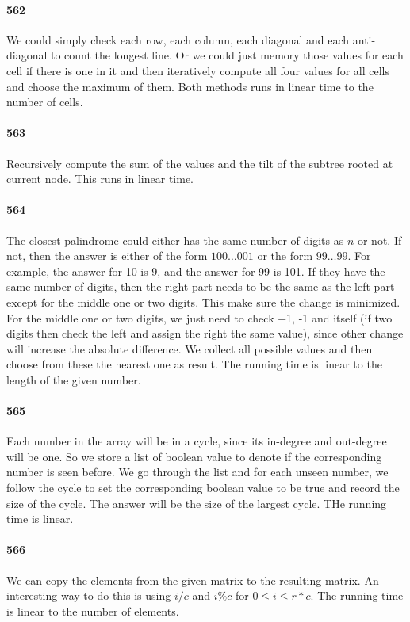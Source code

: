 \documentclass[11pt]{article}
\begin{document}
\begin{itemize}
\paragraph{562}
We could simply check each row, each column, each diagonal and each anti-diagonal to count the longest line. Or we could just
memory those values for each cell if there is one in it and then iteratively compute all four values for all cells and choose
the maximum of them. Both methods runs in linear time to the number of cells.

\paragraph{563}
Recursively compute the sum of the values and the tilt of the subtree rooted at current node. This runs in linear time.

\paragraph{564}
The closest palindrome could either has the same number of digits as $n$ or not. If not, then the answer is either of the form
$100 \dots 001$ or the form $99\dots99$. For example, the answer for 10 is 9, and the answer for 99 is 101. 
If they have the same number of digits, then the right part needs to be the same as the left part except for the middle one
or two digits. This make sure the change is minimized. For the middle one or two digits, we just need to check +1, -1 and
itself (if two digits then check the left and assign the right the same value), since other change will increase the absolute 
difference. We collect all possible values and then choose from these the nearest one as result. 
The running time is linear to the length of the given number.

\paragraph{565}
Each number in the array will be in a cycle, since its in-degree and out-degree will be one. So we store a list of boolean 
value to denote if the corresponding number is seen before. We go through the list and for each unseen number, we follow the 
cycle to set the corresponding boolean value to be true and record the size of the cycle. The answer will be the size of the 
largest cycle. THe running time is linear. 

\paragraph{566}
We can copy the elements from the given matrix to the resulting matrix. An interesting way to do this is using $i/c$ and $i \%
c$ for $0 \le i \le r * c$. The running time is linear to the number of elements.


\end{itemize}
\end{document}
